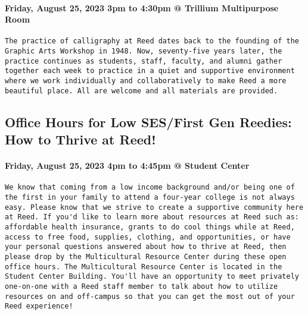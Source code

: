\documentclass[
]{article}
\begin{document}
\hypertarget{friday-august-25-2023-3pm-to-430pm-trillium-multipurpose-room}{%
\paragraph{Friday, August 25, 2023 3pm to 4:30pm @ Trillium Multipurpose
Room}\label{friday-august-25-2023-3pm-to-430pm-trillium-multipurpose-room}}

\begin{verbatim}
The practice of calligraphy at Reed dates back to the founding of the Graphic Arts Workshop in 1948. Now, seventy-five years later, the practice continues as students, staff, faculty, and alumni gather together each week to practice in a quiet and supportive environment where we work individually and collaboratively to make Reed a more beautiful place. All are welcome and all materials are provided.
\end{verbatim}

\hypertarget{office-hours-for-low-sesfirst-gen-reedies-how-to-thrive-at-reed}{%
\subsection{Office Hours for Low SES/First Gen Reedies: How to Thrive at
Reed!}\label{office-hours-for-low-sesfirst-gen-reedies-how-to-thrive-at-reed}}

\hypertarget{friday-august-25-2023-4pm-to-445pm-student-center}{%
\paragraph{Friday, August 25, 2023 4pm to 4:45pm @ Student
Center}\label{friday-august-25-2023-4pm-to-445pm-student-center}}

\begin{verbatim}
We know that coming from a low income background and/or being one of the first in your family to attend a four-year college is not always easy. Please know that we strive to create a supportive community here at Reed. If you'd like to learn more about resources at Reed such as: affordable health insurance, grants to do cool things while at Reed, access to free food, supplies, clothing, and opportunities, or have your personal questions answered about how to thrive at Reed, then please drop by the Multicultural Resource Center during these open office hours. The Multicultural Resource Center is located in the Student Center Building. You'll have an opportunity to meet privately one-on-one with a Reed staff member to talk about how to utilize resources on and off-campus so that you can get the most out of your Reed experience!
\end{verbatim}
\end{document}
